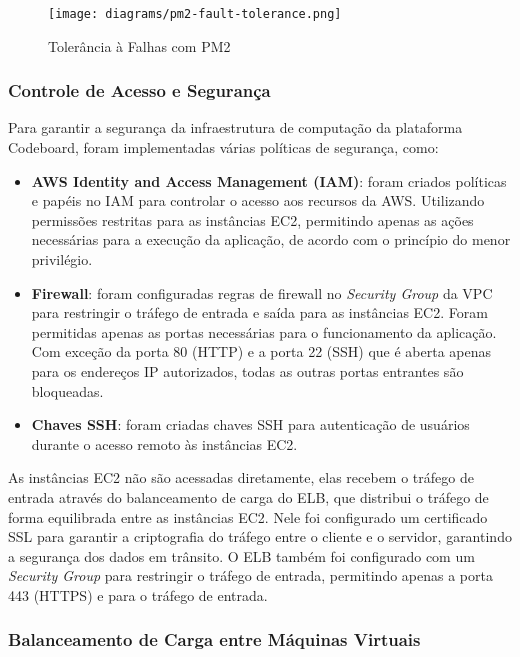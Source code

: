 \begin{figure}[H]
    \centering
    \texttt{[image: diagrams/pm2-fault-tolerance.png]}
    \caption{Tolerância à Falhas com PM2}
    \label{fig:pm2-fault-tolerance}
\end{figure}

\subsubsection{Controle de Acesso e Segurança}

Para garantir a segurança da infraestrutura de computação da plataforma Codeboard, foram implementadas várias políticas de segurança, como:

\begin{itemize}
    \item \textbf{AWS Identity and Access Management (IAM)}: foram criados políticas e papéis no IAM para controlar o acesso aos recursos da AWS. Utilizando permissões restritas para as instâncias EC2, permitindo apenas as ações necessárias para a execução da aplicação, de acordo com o princípio do menor privilégio. %
    \item \textbf{Firewall}: foram configuradas regras de firewall no \emph{Security Group} da VPC para restringir o tráfego de entrada e saída para as instâncias EC2. Foram permitidas apenas as portas necessárias para o funcionamento da aplicação. Com exceção da porta 80 (HTTP) e a porta 22 (SSH) que é aberta apenas para os endereços IP autorizados, todas as outras portas entrantes são bloqueadas.
    \item \textbf{Chaves SSH}: foram criadas chaves SSH para autenticação de usuários durante o acesso remoto às instâncias EC2. 
\end{itemize}

As instâncias EC2 não são acessadas diretamente, elas recebem o tráfego de entrada através do balanceamento de carga do ELB, que distribui o tráfego de forma equilibrada entre as instâncias EC2. Nele foi configurado um certificado SSL para garantir a criptografia do tráfego entre o cliente e o servidor, garantindo a segurança dos dados em trânsito. O ELB também foi configurado com um \emph{Security Group} para restringir o tráfego de entrada, permitindo apenas a porta 443 (HTTPS) e para o tráfego de entrada.

\subsubsection{Balanceamento de Carga entre Máquinas Virtuais}

